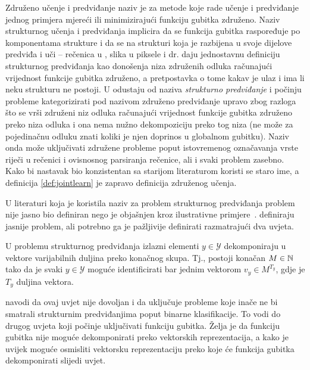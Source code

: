 Združeno učenje i predviđanje  naziv je za
metode koje rade učenje i predviđanje jednog primjera mjereći ili minimizirajući
funkciju gubitka združeno. Naziv strukturnog učenja i predviđanja
 implicira da se funkcija gubitka
raspoređuje po komponentama strukture i da se na strukturi koja je razbijena u
svoje dijelove predviđa i uči -- rečenica u , slika u piksele
i dr. \citet{daume14lts} daju jednostavnu definiciju strukturnog predviđanja kao
donošenja niza združenih odluka računajući vrijednost funkcije gubitka združeno,
a pretpostavka o tome kakav je ulaz i ima li neku strukturu ne postoji. U
\citep{daume14lts, daume15naacltalk} odustaju od naziva \emph{strukturno
predviđanje} i počinju probleme kategorizirati pod nazivom združeno predviđanje
upravo zbog razloga što se vrši združeni niz odluka računajući vrijednost
funkcije gubitka združeno preko niza odluka i ona nema nužno dekompoziciju preko
tog niza (ne može za pojedinačnu odluku znati koliki je njen doprinos u
globalnom gubitku). Naziv onda može uključivati združene probleme poput
istovremenog označavanja vrste riječi u rečenici i ovisnosnog parsiranja
rečenice, ali i svaki problem zasebno. Kako bi nastavak bio konzistentan sa
starijom literaturom koristi se staro ime, a definicija \ref{def:jointlearn} je
zapravo definicija združenog učenja.

U literaturi koja je koristila naziv za problem strukturnog predviđanja problem
nije jasno bio definiran nego je objašnjen kroz ilustrativne
primjere~\citep{mccallum2000maximum, punyakanok2001use, lafferty2001conditional,
collins2002discriminative, taskar2003maximum, mcallester2004case,
tsochantaridis2005large}. \citet{daume09searn} definiraju jasnije problem, ali
potrebno ga je pažljivije definirati razmatrajući dva uvjeta.

\begin{condition} \label{uvjet1}

  U problemu strukturnog predviđanja izlazni elementi $y \in \mathcal{Y}$
  dekomponiraju u vektore varijabilnih duljina preko konačnog skupa. Tj.,
  postoji konačan $M \in \mathbb{N}$ tako da je svaki $y \in \mathcal{Y}$ moguće
  identificirati bar jednim vektorom $v_y \in M^{T_y}$, gdje je $T_y$ duljina
  vektora.

\end{condition}

\noindent
\citeauthor{daume06thesis} navodi da ovaj uvjet nije dovoljan i da uključuje
probleme koje inače ne bi smatrali strukturnim predviđanjima poput binarne
klasifikacije. To vodi do drugog uvjeta koji počinje uključivati funkciju
gubitka. Želja je da funkciju gubitka nije moguće dekomponirati preko vektorskih
reprezentacija, a kako je uvijek moguće osmisliti vektorsku reprezentaciju preko
koje će funkcija gubitka dekomponirati slijedi uvjet.

